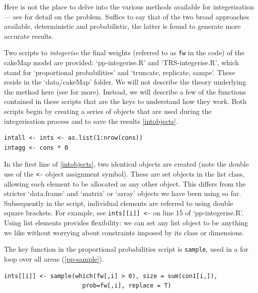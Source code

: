 \documentclass[a4paper, 11pt, twoside]{article}
\begin{document}
Here is not the place to delve into the various methods available for integerisation ---
see \citep{Lovelace2013-trs} for detail on the problem. Suffice to say that
of the two broad approaches available, deterministic and probabilistic, the latter
is found to generate more accurate results.

Two scripts to \emph{integerise} the final weights (referred to as \texttt{fw}
in the code) of the cakeMap model
are provided: `pp-integerise.R' and `TRS-integerise.R', which stand for
`proportional probabilities' and `truncate, replicate, sampe'.
These reside in the `data/cakeMap' folder.
We will not describe the theory underlying the method here (see \citealp{Lovelace2013-trs} for more).
Instead, we will describe a few of the functions contained in these scripts that are
the keys to understand how they work. Both scripts begin by creating
a series of objects that are used during the integerisation process
and to save the results \cref{intobjects}.  

\begin{lstlisting}[float=h, caption={The new objects that
are created in at the beginning of the integerisation scrips (see lines 7 to 8 in `pp-integerise.R' and
`TRS-integeris.R').}, label=intobjects]
intall <- ints <- as.list(1:nrow(cons)) 
intagg <- cons * 0
\end{lstlisting}

In the first line of \cref{intobjects}, two identical objects are created
(note the double use of the \texttt{<-} object assignment symbol).
These are set objects in the list class, allowing each element to be
allocated as any other object. This differs from the stricter
`data.frame' and `matrix' or `array' objects we have been using so far.
Subsequently in the script, individual elements are referred to using
double square brackets. For example, see \texttt{ints[[i]] <-} on line
15 of `pp-integerise.R'. Using list elements provides flexibility:
we can set any list object to be anything we like without
worrying about constraints imposed by its class or dimensions.

The key function in the proportional probabilities
script is \texttt{sample}, used in a for loop over
all areas (\cref{pp-sample}).

\begin{lstlisting}[float=h, caption={The sample function,
key to R's implementation of the proportional probabilities
integerisation algorithm (see lines 15 and 16 of `pp-integerise.R').}, label=pp-sample]
ints[[i]] <- sample(which(fw[,i] > 0), size = sum(con1[i,]), 
                      prob=fw[,i], replace = T) 
\end{lstlisting}
\end{document}
